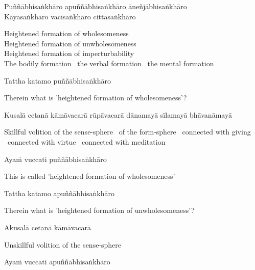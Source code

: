 Puññābhisaṅkhāro apuññābhisaṅkhāro āneñjābhisaṅkhāro\\
Kāyasaṅkhāro vacīsaṅkhāro cittasaṅkhāro

\begin{english}
  Heightened formation of wholesomeness\\
  Heightened formation of unwholesomeness\\
  Heightened formation of imperturbability\\
  The bodily formation \breathmark\ the verbal formation \breathmark\ the mental formation
\end{english}

Tattha katamo puññābhisaṅkhāro

\begin{english}
  Therein what is 'heightened formation of wholesomeness'?
\end{english}

Kusalā cetanā kāmāvacarā rūpāvacarā dānamayā sīlamayā bhāvanāmayā

\begin{english}
  Skillful volition of the sense-sphere \breathmark\ of the form-sphere \breathmark\ connected with giving \breathmark\ connected with virtue \breathmark\ connected with meditation
\end{english}

Ayaṁ vuccati puññābhisaṅkhāro

\begin{english}
  This is called 'heightened formation of wholesomeness'
\end{english}

Tattha katamo apuññābhisaṅkhāro

\begin{english}
  Therein what is 'heightened formation of unwholesomeness'?
\end{english}

Akusalā cetanā kāmāvacarā

\begin{english}
  Unskillful volition of the sense-sphere
\end{english}

Ayaṁ vuccati apuññābhisaṅkhāro

